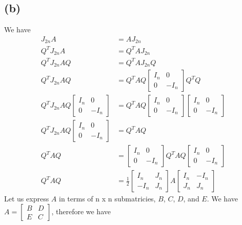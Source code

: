 \subsection*{(b)}
We have
\begin{align*}
    J_{2n}A&=AJ_{2n}\\
    Q^TJ_{2n}A&=Q^TAJ_{2n}\\
    Q^TJ_{2n}AQ&=Q^TAJ_{2n}Q\\
    Q^TJ_{2n}AQ&=Q^TAQ\begin{bmatrix}
        I_n & 0\\
        0 & -I_n
    \end{bmatrix}Q^TQ\\
    Q^TJ_{2n}AQ\begin{bmatrix}
        I_n & 0\\
        0 & -I_n
    \end{bmatrix}&=Q^TAQ\begin{bmatrix}
        I_n & 0\\
        0 & -I_n
    \end{bmatrix}\begin{bmatrix}
        I_n & 0\\
        0 & -I_n
    \end{bmatrix}\\
    Q^TJ_{2n}AQ\begin{bmatrix}
        I_n & 0\\
        0 & -I_n
    \end{bmatrix}&=Q^TAQ\\
    Q^TAQ&=\begin{bmatrix}
        I_n & 0\\
        0 & -I_n
    \end{bmatrix}Q^TAQ\begin{bmatrix}
        I_n & 0\\
        0 & -I_n
    \end{bmatrix}\\
    Q^TAQ&=\frac{1}{2} \begin{bmatrix}
        I_n & J_n\\
        -I_n & J_n
    \end{bmatrix} A \begin{bmatrix}
        I_n & -I_n\\
        J_n & J_n
    \end{bmatrix}
\end{align*}
Let us express $A$ in terms of n x n submatricies, $B$, $C$, $D$, and $E$. 
We have
$A=\begin{bmatrix}
    B & D\\
    E & C
\end{bmatrix}$, therefore we have
